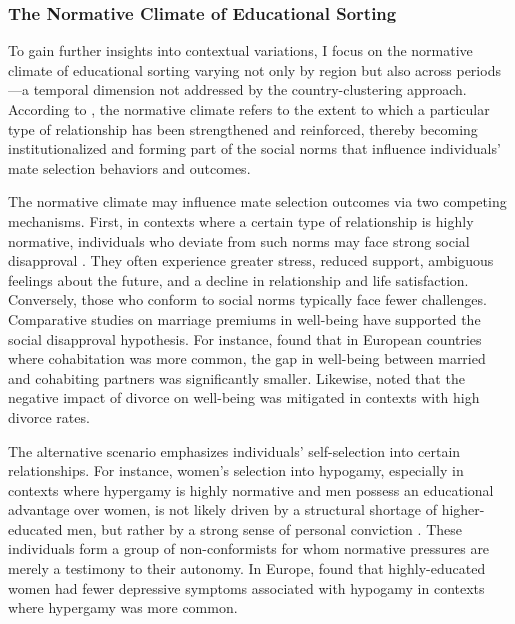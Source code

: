 \subsubsection{The Normative Climate of Educational Sorting}

To gain further insights into contextual variations, I focus on the normative climate of educational sorting varying not only by region but also across periods—a temporal dimension not addressed by the country-clustering approach. According to \textcite{cherlinDeinstitutionalizationAmericanMarriage2004}, the normative climate refers to the extent to which a particular type of relationship has been strengthened and reinforced, thereby becoming institutionalized and forming part of the social norms that influence individuals' mate selection behaviors and outcomes.

The normative climate may influence mate selection outcomes via two competing mechanisms. First, in contexts where a certain type of relationship is highly normative, individuals who deviate from such norms may face strong social disapproval \parencite{keizerAreEqualsHappier2015,soonsMarriageMoreCohabitation2009}. They often experience greater stress, reduced support, ambiguous feelings about the future, and a decline in relationship and life satisfaction. Conversely, those who conform to social norms typically face fewer challenges. Comparative studies on marriage premiums in well-being have supported the social disapproval hypothesis. For instance, \textcite{soonsMarriageMoreCohabitation2009} found that in European countries where cohabitation was more common, the gap in well-being between married and cohabiting partners was significantly smaller. Likewise, \textcite{kalmijnCountryDifferencesEffects2010} noted that the negative impact of divorce on well-being was mitigated in contexts with high divorce rates.

The alternative scenario emphasizes individuals' self-selection into certain relationships. For instance, women’s selection into hypogamy, especially in contexts where hypergamy is highly normative and men possess an educational advantage over women, is not likely driven by a structural shortage of higher-educated men, but rather by a strong sense of personal conviction \parencite{potarcaAreWomenHypogamous2022}. These individuals form a group of non-conformists for whom normative pressures are merely a testimony to their autonomy. In Europe, \textcite{potarcaAreWomenHypogamous2022} found that highly-educated women had fewer depressive symptoms associated with hypogamy in contexts where hypergamy was more common.

